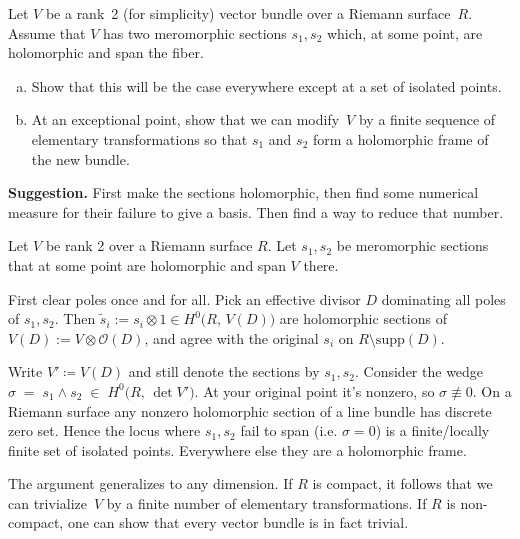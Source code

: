 \documentclass[12pt]{article}
\begin{document}
\begin{exercise}

Let $V$ be a rank~2 (for simplicity) vector bundle over a Riemann surface~$R$. 
Assume that $V$ has two meromorphic sections $s_1, s_2$ which, at some point, 
are holomorphic and span the fiber.

\begin{enumerate}[(a)]
    \item Show that this will be the case everywhere except at a set of isolated points.
    \item At an exceptional point, show that we can modify~$V$ by a finite sequence 
    of elementary transformations so that $s_1$ and $s_2$ form a holomorphic frame 
    of the new bundle.
\end{enumerate}

\textbf{Suggestion.} First make the sections holomorphic, then find some numerical measure 
for their failure to give a basis. Then find a way to reduce that number.
\end{exercise}

\begin{solution}
Let $V$ be rank 2 over a Riemann surface $R$. Let $s_1,s_2$ be meromorphic sections that at some point are holomorphic and span $V$ there.

First clear poles once and for all. Pick an effective divisor $D$ dominating all poles of $s_1,s_2$. Then
$\tilde s_i := s_i\otimes 1 \in H^0\big(R,\,V(D)\big)$
are holomorphic sections of $V(D):=V\otimes \mathcal{O}(D)$, and agree with the original $s_i$ on $R\setminus \mathrm{supp}(D)$.

Write $V'\coloneqq V(D)$ and still denote the sections by $s_1,s_2$. Consider the wedge
$\sigma \;=\; s_1\wedge s_2 \;\in\; H^0\big(R,\,\det V'\big)$.
At your original point it's nonzero, so $\sigma\not\equiv 0$. On a Riemann surface any nonzero holomorphic section of a line bundle has discrete zero set. Hence the locus where $s_1,s_2$ fail to span (i.e. $\sigma=0$) is a finite/locally finite set of isolated points. Everywhere else they are a holomorphic frame.
\end{solution}

\begin{remark}
The argument generalizes to any dimension. If $R$ is compact, it follows that we can trivialize~$V$ by a finite number of elementary transformations. If $R$ is non-compact, one can show that every vector bundle is in fact trivial.
\end{remark}
\end{document}
